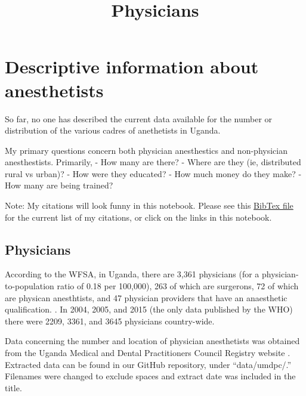 \documentclass[11pt]{article}
\title{Physicians}
\begin{document}
    
    
    \maketitle
    
    

    
    \hypertarget{descriptive-information-about-anesthetists}{%
\section{Descriptive information about
anesthetists}\label{descriptive-information-about-anesthetists}}

So far, no one has described the current data available for the number
or distribution of the various cadres of anethetists in Uganda.

My primary questions concern both physician anesthestics and
non-physician anesthestists. Primarily, - How many are there? - Where
are they (ie, distributed rural vs urban)? - How were they educated? -
How much money do they make? - How many are being trained?

Note: My citations will look funny in this notebook. Please see this
\href{https://github.com/alexgoodell/uganda-model/blob/master/refs/library.bib}{BibTex
file} for the current list of my citations, or click on the links in
this notebook.

\hypertarget{physicians}{%
\subsection{Physicians}\label{physicians}}

According to the WFSA, in Uganda, there are 3,361 physicians (for a
physician-to-population ratio of 0.18 per 100,000), 263 of which are
surgerons, 72 of which are physican anesthtists, and 47 physician
providers that have an anaesthetic qualification. \cite{wfsaug2018}. In
2004, 2005, and 2015 (the only data published by the WHO) there were
2209, 3361, and 3645 physicians country-wide. \cite{whogho2018}

Data concerning the number and location of physician anesthetists was
obtained from the Uganda Medical and Dental Practitioners Council
Registry website \cite{umdpc2018reg}. Extracted data can be found in our
GitHub repository, under ``data/umdpc/.'' Filenames were changed to
exclude spaces and extract date was included in the title.
\end{document}
